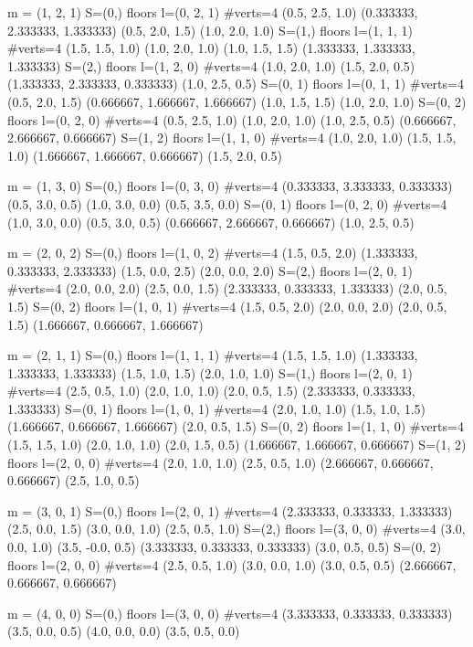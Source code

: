 m = (1, 2, 1)
  S=(0,)  floors l=(0, 2, 1)  #verts=4
     (0.5, 2.5, 1.0)
     (0.333333, 2.333333, 1.333333)
     (0.5, 2.0, 1.5)
     (1.0, 2.0, 1.0)
  S=(1,)  floors l=(1, 1, 1)  #verts=4
     (1.5, 1.5, 1.0)
     (1.0, 2.0, 1.0)
     (1.0, 1.5, 1.5)
     (1.333333, 1.333333, 1.333333)
  S=(2,)  floors l=(1, 2, 0)  #verts=4
     (1.0, 2.0, 1.0)
     (1.5, 2.0, 0.5)
     (1.333333, 2.333333, 0.333333)
     (1.0, 2.5, 0.5)
  S=(0, 1)  floors l=(0, 1, 1)  #verts=4
     (0.5, 2.0, 1.5)
     (0.666667, 1.666667, 1.666667)
     (1.0, 1.5, 1.5)
     (1.0, 2.0, 1.0)
  S=(0, 2)  floors l=(0, 2, 0)  #verts=4
     (0.5, 2.5, 1.0)
     (1.0, 2.0, 1.0)
     (1.0, 2.5, 0.5)
     (0.666667, 2.666667, 0.666667)
  S=(1, 2)  floors l=(1, 1, 0)  #verts=4
     (1.0, 2.0, 1.0)
     (1.5, 1.5, 1.0)
     (1.666667, 1.666667, 0.666667)
     (1.5, 2.0, 0.5)

m = (1, 3, 0)
  S=(0,)  floors l=(0, 3, 0)  #verts=4
     (0.333333, 3.333333, 0.333333)
     (0.5, 3.0, 0.5)
     (1.0, 3.0, 0.0)
     (0.5, 3.5, 0.0)
  S=(0, 1)  floors l=(0, 2, 0)  #verts=4
     (1.0, 3.0, 0.0)
     (0.5, 3.0, 0.5)
     (0.666667, 2.666667, 0.666667)
     (1.0, 2.5, 0.5)

m = (2, 0, 2)
  S=(0,)  floors l=(1, 0, 2)  #verts=4
     (1.5, 0.5, 2.0)
     (1.333333, 0.333333, 2.333333)
     (1.5, 0.0, 2.5)
     (2.0, 0.0, 2.0)
  S=(2,)  floors l=(2, 0, 1)  #verts=4
     (2.0, 0.0, 2.0)
     (2.5, 0.0, 1.5)
     (2.333333, 0.333333, 1.333333)
     (2.0, 0.5, 1.5)
  S=(0, 2)  floors l=(1, 0, 1)  #verts=4
     (1.5, 0.5, 2.0)
     (2.0, 0.0, 2.0)
     (2.0, 0.5, 1.5)
     (1.666667, 0.666667, 1.666667)

m = (2, 1, 1)
  S=(0,)  floors l=(1, 1, 1)  #verts=4
     (1.5, 1.5, 1.0)
     (1.333333, 1.333333, 1.333333)
     (1.5, 1.0, 1.5)
     (2.0, 1.0, 1.0)
  S=(1,)  floors l=(2, 0, 1)  #verts=4
     (2.5, 0.5, 1.0)
     (2.0, 1.0, 1.0)
     (2.0, 0.5, 1.5)
     (2.333333, 0.333333, 1.333333)
  S=(0, 1)  floors l=(1, 0, 1)  #verts=4
     (2.0, 1.0, 1.0)
     (1.5, 1.0, 1.5)
     (1.666667, 0.666667, 1.666667)
     (2.0, 0.5, 1.5)
  S=(0, 2)  floors l=(1, 1, 0)  #verts=4
     (1.5, 1.5, 1.0)
     (2.0, 1.0, 1.0)
     (2.0, 1.5, 0.5)
     (1.666667, 1.666667, 0.666667)
  S=(1, 2)  floors l=(2, 0, 0)  #verts=4
     (2.0, 1.0, 1.0)
     (2.5, 0.5, 1.0)
     (2.666667, 0.666667, 0.666667)
     (2.5, 1.0, 0.5)

m = (3, 0, 1)
  S=(0,)  floors l=(2, 0, 1)  #verts=4
     (2.333333, 0.333333, 1.333333)
     (2.5, 0.0, 1.5)
     (3.0, 0.0, 1.0)
     (2.5, 0.5, 1.0)
  S=(2,)  floors l=(3, 0, 0)  #verts=4
     (3.0, 0.0, 1.0)
     (3.5, -0.0, 0.5)
     (3.333333, 0.333333, 0.333333)
     (3.0, 0.5, 0.5)
  S=(0, 2)  floors l=(2, 0, 0)  #verts=4
     (2.5, 0.5, 1.0)
     (3.0, 0.0, 1.0)
     (3.0, 0.5, 0.5)
     (2.666667, 0.666667, 0.666667)

m = (4, 0, 0)
  S=(0,)  floors l=(3, 0, 0)  #verts=4
     (3.333333, 0.333333, 0.333333)
     (3.5, 0.0, 0.5)
     (4.0, 0.0, 0.0)
     (3.5, 0.5, 0.0)
